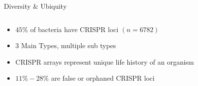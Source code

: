 \documentclass[dvipsnames]{beamer}
\begin{document}
\begin{frame}[fragile]{Diversity \& Ubiquity}
    \begin{columns}
    \begin{column}{0.5\textwidth}
        \begin{itemize}
            \item<2-> $45\%$ of bacteria have CRISPR loci $(n=6782)$ \autocite{crispdb}
            \item<3-> 3 Main Types, multiple sub types \autocite{acqorres}
            \item<4-> CRISPR arrays represent unique life history of an organism
            \item<5-> $11\%-28\%$ are false or orphaned CRISPR loci \autocite{ineqcas}
        \end{itemize}
    \end{column}
    \begin{column}{0.5\textwidth}
    \begin{figure}[htb!]
        \autocite{evocas}
    \end{figure}
    \end{column}
    \end{columns}
\end{frame}
\end{document}
